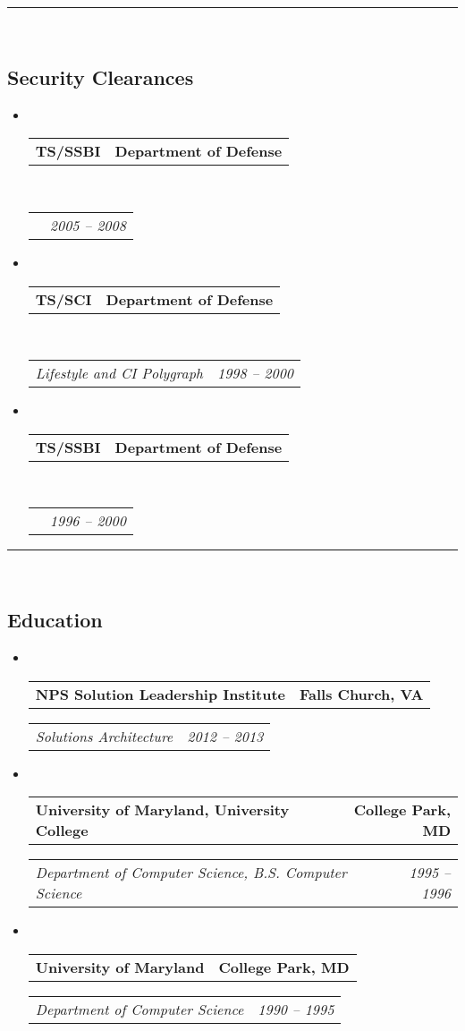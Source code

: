 \documentclass[10pt,letterpaper]{article}
\makeatletter
\newcommand{\headerrow}[2]
{\begin{tabular*}{\linewidth}{l@{\extracolsep{\fill}}r}
	#1 &
	#2 \\
\end{tabular*}}
\makeatother
\begin{document}
\hrule\
\vspace{-0.4em}
\subsection*{Security Clearances}

\begin{itemize}
	\parskip=0.1em

	\item\ 
	\headerrow
		{\textbf{TS/SSBI}}
		{\textbf{Department of Defense}}
	\\
	\headerrow
		{\emph{}}
		{\emph{2005 -- 2008}}
	\item\ 
	\headerrow
		{\textbf{TS/SCI}}
		{\textbf{Department of Defense}}
	\\
	\headerrow
		{\emph{Lifestyle and CI Polygraph}}
		{\emph{1998 -- 2000}}		
	\item\ 
	\headerrow
		{\textbf{TS/SSBI}}
		{\textbf{Department of Defense}}
	\\
	\headerrow
		{\emph{}}
		{\emph{1996 -- 2000}}
\end{itemize}

\hrule\
\vspace{-0.4em}
\subsection*{Education}

\begin{itemize}
	\parskip=0.1em

	\item\ 
	\headerrow
		{\textbf{NPS Solution Leadership Institute}}
		{\textbf{Falls Church, VA}}
	\headerrow
		{\emph{Solutions Architecture}}
		{\emph{2012 -- 2013}}

	\item\ 
	\headerrow
		{\textbf{University of Maryland, University College}}
		{\textbf{College Park, MD}}
	\headerrow
		{\emph{Department of Computer Science, B.S. Computer Science}}
		{\emph{1995 -- 1996}}

	\item\ 
	\headerrow
		{\textbf{University of Maryland}}
		{\textbf{College Park, MD}}
	\headerrow
		{\emph{Department of Computer Science}}
		{\emph{1990 -- 1995}}
\end{itemize}
\end{document}
